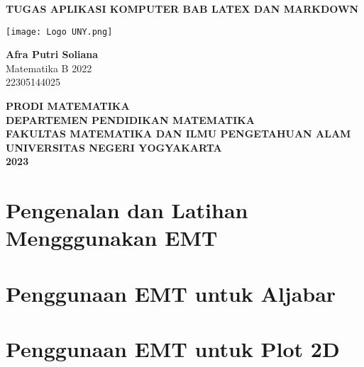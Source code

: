 \documentclass{report}
\begin{document}
\begin{titlepage}
    \begin{center}
        \vspace*{0,2cm}

        \Huge
        \textbf{TUGAS APLIKASI KOMPUTER BAB LATEX DAN MARKDOWN}

        \vspace{1cm}

        \LARGE

        \vspace{1cm}

        \texttt{[image: Logo UNY.png]}

        \vspace{1cm}

        \textbf{Afra Putri Soliana}\\Matematika B 2022\\22305144025

        \vspace{2cm}

        \Large
        \textbf{PRODI MATEMATIKA}\\
        \textbf{DEPARTEMEN PENDIDIKAN MATEMATIKA}\\
        \textbf{FAKULTAS MATEMATIKA DAN ILMU PENGETAHUAN ALAM}\\
        \textbf{UNIVERSITAS NEGERI YOGYAKARTA}\\
        \textbf{2023}

    \end{center}
\end{titlepage}

\newpage
\tableofcontents

\chapter{Pengenalan dan Latihan Mengggunakan EMT}


\newpage
\chapter{Penggunaan EMT untuk Aljabar}


\newpage
\chapter{Penggunaan EMT untuk Plot 2D}

\end{document}
